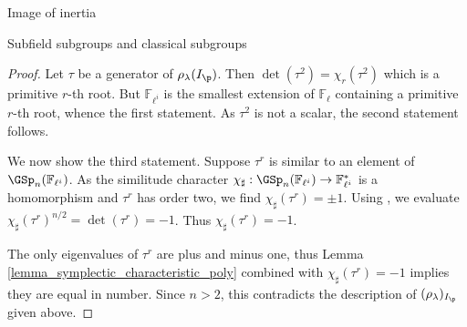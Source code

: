 \documentclass[11pt,a4paper]{article}
\newcommand{\Fl}{\mathbb{F}_\ell}
\newcommand{\Fli}{\mathbb{F}_{\ell^i}}
\begin{document}
\begin{section}{Image of inertia}
\begin{subsection}{Subfield subgroups and classical subgroups}
\begin{proof}
Let $\tau$ be a generator of $\rho_\lambda(I_\p)$. Then $\det ( \tau^2) = \chi_r(\tau^2)$ which is a primitive $r$-th root. But $\Fli$ is the smallest extension of $\Fl$ containing a primitive $r$-th root, whence the first statement.
As $\tau^2$ is not a scalar, the second statement follows.

We now show the third statement. Suppose $\tau^r$ is similar to an element of $\GSp_n(\Fli)$.
As the similitude character $\chi_\sharp : \GSp_n(\Fli) \rightarrow \Fli^*$ is a homomorphism and $\tau^r$ has order two, we find $\chi_\sharp (\tau^r)=\pm 1$.
Using \cite[Lemma 2.4.5]{KleidmanLiebeck}, we evaluate $\chi_\sharp (\tau^r)^{n/2}= \det( \tau^r)=-1$. Thus $\chi_\sharp (\tau^r)=-1$.


The only eigenvalues of $\tau^r$ are plus and minus one, thus Lemma \ref{lemma_symplectic_characteristic_poly} combined with $\chi_\sharp (\tau^r)=-1$ implies they are equal in number. Since $n>2$, this contradicts the description of $(\rho_\lambda)_{I_\p}$ given above.
\end{proof}

\end{subsection}
\end{section}
\end{document}
